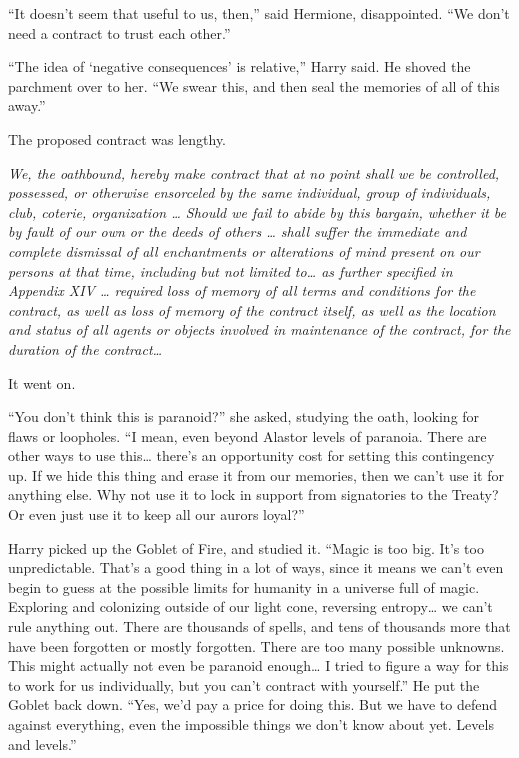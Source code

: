 ``It doesn't seem that useful to us, then,'' said Hermione,
disappointed. ``We don't need a contract to trust each other.''

``The idea of `negative consequences' is relative,'' Harry said. He
shoved the parchment over to her. ``We swear this, and then seal the
memories of all of this away.''

The proposed contract was lengthy.

\emph{We, the oathbound, hereby make contract that at no point shall we
be controlled, possessed, or otherwise ensorceled by the same
individual, group of individuals, club, coterie, organization \ldots{}
Should we fail to abide by this bargain, whether it be by fault of our
own or the deeds of others \ldots{} shall suffer the immediate and
complete dismissal of all enchantments or alterations of mind present on
our persons at that time, including but not limited to\ldots{} as
further specified in Appendix XIV \ldots{} required loss of memory of
all terms and conditions for the contract, as well as loss of memory of
the contract itself, as well as the location and status of all agents or
objects involved in maintenance of the contract, for the duration of the
contract\ldots{}}

It went on.

``You don't think this is paranoid?'' she asked, studying the oath,
looking for flaws or loopholes. ``I mean, even beyond Alastor levels of
paranoia. There are other ways to use this\ldots{} there's an
opportunity cost for setting this contingency up. If we hide this thing
and erase it from our memories, then we can't use it for anything else.
Why not use it to lock in support from signatories to the Treaty? Or
even just use it to keep all our aurors loyal?''

Harry picked up the Goblet of Fire, and studied it. ``Magic is too big.
It's too unpredictable. That's a good thing in a lot of ways, since it
means we can't even begin to guess at the possible limits for humanity
in a universe full of magic. Exploring and colonizing outside of our
light cone, reversing entropy\ldots{} we can't rule anything out. There
are thousands of spells, and tens of thousands more that have been
forgotten or mostly forgotten. There are too many possible unknowns.
This might actually not even be paranoid enough\ldots{} I tried to
figure a way for this to work for us individually, but you can't
contract with yourself.'' He put the Goblet back down. ``Yes, we'd pay a
price for doing this. But we have to defend against everything, even the
impossible things we don't know about yet. Levels and levels.''

